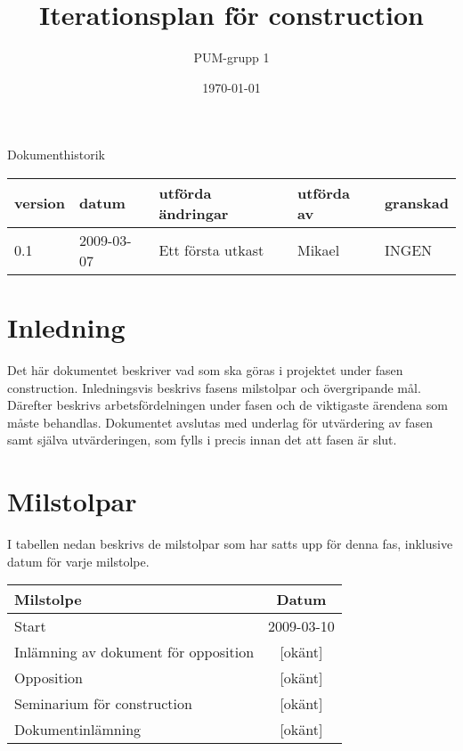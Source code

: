 

\ifpdf
\else
\fi

\title{Iterationsplan för construction}
\author{PUM-grupp 1}
\date{\today}



\maketitle\thispagestyle{empty}
\newpage

{\centering \Large{Dokumenthistorik\\}}

\vspace{10pt}
\begin{tabularx}{\textwidth}{ |l|l|X|l|l| }
  \hline
    \textbf{version} & \textbf{datum} & \textbf{utförda ändringar} & \textbf{utförda av} & \textbf{granskad} \\
	\hline 0.1 & 2009-03-07 & Ett första utkast & Mikael & INGEN \\
  \hline
\end{tabularx}

\newpage

\setcounter{tocdepth}{2}
\tableofcontents
\newpage

\section{Inledning}
Det här dokumentet beskriver vad som ska göras i projektet under fasen construction. Inledningsvis beskrivs fasens milstolpar och övergripande mål. Därefter beskrivs arbetsfördelningen under fasen och de viktigaste ärendena som måste behandlas. Dokumentet avslutas med underlag för utvärdering av fasen samt själva utvärderingen, som fylls i precis innan det att fasen är slut.

\section{Milstolpar}
I tabellen nedan beskrivs de milstolpar som har satts upp för denna fas, inklusive datum för varje milstolpe.

\begin{center}
	\begin{tabular}{| l | c |}
	\hline \textbf{Milstolpe} & \textbf{Datum} \\
	\hline Start & 2009-03-10 \\
	\hline Inlämning av dokument för opposition & [okänt] \\
	\hline Opposition & [okänt] \\
	\hline Seminarium för construction & [okänt] \\
	\hline Dokumentinlämning & [okänt] \\
	\hline
	\end{tabular}
\end{center}

